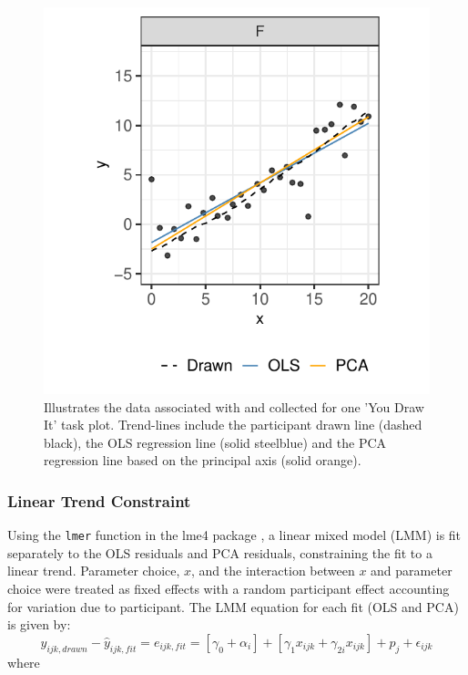 \documentclass[12pt]{article}
\begin{document}
\begin{figure}[tbp]

{\centering \includegraphics[width=0.5\linewidth,]{Eye-Fitting-Straight-Lines-in-the-Modern-Era_files/figure-latex/eyefitting-example-plot-1} 

}

\caption{Illustrates the data associated with and collected for one 'You Draw It' task plot. Trend-lines include the participant drawn line (dashed black), the OLS regression line (solid steelblue) and the PCA regression line based on the principal axis (solid orange).}\label{fig:eyefitting-example-plot}
\end{figure}

\hypertarget{linear-trend-constraint}{%
\subsubsection{Linear Trend Constraint}\label{linear-trend-constraint}}

Using the \texttt{lmer} function in the lme4 package \citep{lme4}, a
linear mixed model (LMM) is fit separately to the OLS residuals and PCA
residuals, constraining the fit to a linear trend. Parameter choice,
\(x\), and the interaction between \(x\) and parameter choice were
treated as fixed effects with a random participant effect accounting for
variation due to participant. The LMM equation for each fit (OLS and
PCA) is given by: \begin{equation}
y_{ijk,drawn} - \hat y_{ijk,fit} = e_{ijk,fit} = \left[\gamma_0 + \alpha_i\right] + \left[\gamma_{1} x_{ijk} + \gamma_{2i} x_{ijk}\right] + p_{j} + \epsilon_{ijk}
\end{equation} \noindent where
\end{document}
